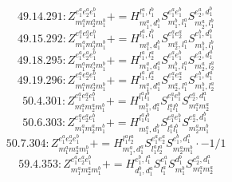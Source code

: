 \documentclass[letterpaper,10pt,fleqn,leqno,onecolumn]{article}
\begin{document}
\begin{equation} \;\;\;\;\;\;  49.14.291: Z^{e_{1}^{a}e_{2}^{a}e_{1}^{b}}_{m_{1}^{a}m_{2}^{a}m_{1}^{b}}+=H^{l_{1}^{a},l_{1}^{b}}_{m_{1}^{a},d_{1}^{b}}S^{e_{1}^{a}e_{1}^{b}}_{m_{1}^{b},l_{1}^{a}}S^{e_{2}^{a},d_{1}^{b}}_{m_{2}^{a},l_{1}^{b}} \end{equation}
\begin{equation} \;\;\;\;\;\;  49.15.292: Z^{e_{1}^{a}e_{2}^{a}e_{1}^{b}}_{m_{1}^{a}m_{2}^{a}m_{1}^{b}}+=H^{l_{1}^{a},l_{1}^{b}}_{m_{1}^{a},d_{1}^{b}}S^{e_{1}^{a}e_{2}^{a}}_{m_{2}^{a},l_{1}^{a}}S^{e_{1}^{b},d_{1}^{b}}_{m_{1}^{b},l_{1}^{b}} \end{equation}
\begin{equation} \;\;\;\;\;\;  49.18.295: Z^{e_{1}^{a}e_{2}^{a}e_{1}^{b}}_{m_{1}^{a}m_{2}^{a}m_{1}^{b}}+=H^{l_{1}^{a},l_{2}^{a}}_{m_{1}^{a},d_{1}^{a}}S^{e_{1}^{a}e_{1}^{b}}_{m_{1}^{b},l_{1}^{a}}S^{e_{2}^{a},d_{1}^{a}}_{m_{2}^{a},l_{2}^{a}} \end{equation}
\begin{equation} \;\;\;\;\;\;  49.19.296: Z^{e_{1}^{a}e_{2}^{a}e_{1}^{b}}_{m_{1}^{a}m_{2}^{a}m_{1}^{b}}+=H^{l_{1}^{a},l_{2}^{a}}_{m_{1}^{a},d_{1}^{a}}S^{e_{1}^{a}e_{2}^{a}}_{m_{2}^{a},l_{1}^{a}}S^{e_{1}^{b},d_{1}^{a}}_{m_{1}^{b},l_{2}^{a}} \end{equation}
\begin{equation} \;\;\;\;\;\;  50.4.301: Z^{e_{1}^{a}e_{2}^{a}e_{1}^{b}}_{m_{1}^{a}m_{2}^{a}m_{1}^{b}}+=H^{l_{1}^{a}l_{1}^{b}}_{m_{1}^{b},d_{1}^{a}}S^{e_{1}^{a}e_{1}^{b}}_{l_{1}^{a}l_{1}^{b}}S^{e_{2}^{a},d_{1}^{a}}_{m_{1}^{a}m_{2}^{a}} \end{equation}
\begin{equation} \;\;\;\;\;\;  50.6.303: Z^{e_{1}^{a}e_{2}^{a}e_{1}^{b}}_{m_{1}^{a}m_{2}^{a}m_{1}^{b}}+=H^{l_{1}^{a}l_{1}^{b}}_{m_{1}^{a},d_{1}^{b}}S^{e_{1}^{a}e_{1}^{b}}_{l_{1}^{a}l_{1}^{b}}S^{e_{2}^{a},d_{1}^{b}}_{m_{2}^{a}m_{1}^{b}} \end{equation}
\begin{equation} \;\;\;\;\;\;  50.7.304: Z^{e_{1}^{a}e_{2}^{a}e_{1}^{b}}_{m_{1}^{a}m_{2}^{a}m_{1}^{b}}+=H^{l_{1}^{a}l_{2}^{a}}_{m_{1}^{a},d_{1}^{a}}S^{e_{1}^{a}e_{2}^{a}}_{l_{1}^{a}l_{2}^{a}}S^{e_{1}^{b},d_{1}^{a}}_{m_{2}^{a}m_{1}^{b}}\cdot -1/1 \end{equation}
\begin{equation} \;\;\;\;\;\;  59.4.353: Z^{e_{1}^{a}e_{2}^{a}e_{1}^{b}}_{m_{1}^{a}m_{2}^{a}m_{1}^{b}}+=H^{e_{1}^{b},l_{1}^{a}}_{d_{1}^{b},d_{1}^{a}}S^{e_{1}^{a}}_{l_{1}^{a}}S^{d_{1}^{b}}_{m_{1}^{b}}S^{e_{2}^{a},d_{1}^{a}}_{m_{1}^{a}m_{2}^{a}} \end{equation}
\end{document}
